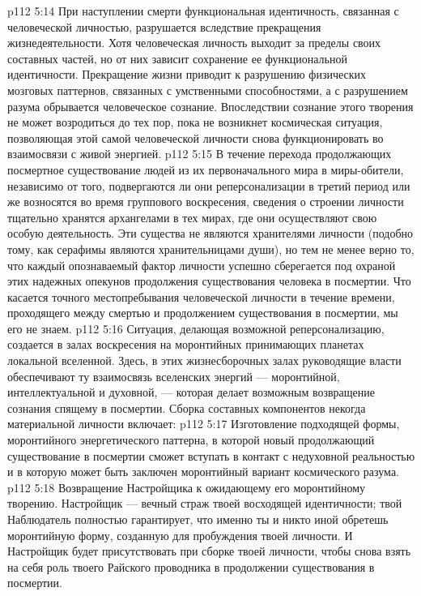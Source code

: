 \vs p112 5:14 При наступлении смерти функциональная идентичность, связанная с человеческой личностью, разрушается вследствие прекращения жизнедеятельности. Хотя человеческая личность выходит за пределы своих составных частей, но от них зависит сохранение ее функциональной идентичности. Прекращение жизни приводит к разрушению физических мозговых паттернов, связанных с умственными способностями, а с разрушением разума обрывается человеческое сознание. Впоследствии сознание этого творения не может возродиться до тех пор, пока не возникнет космическая ситуация, позволяющая этой самой человеческой личности снова функционировать во взаимосвязи с живой энергией.
\vs p112 5:15 \pc В течение перехода продолжающих посмертное существование людей из их первоначального мира в миры\hyp{}обители, независимо от того, подвергаются ли они реперсонализации в третий период или же возносятся во время группового воскресения, сведения о строении личности тщательно хранятся архангелами в тех мирах, где они осуществляют свою особую деятельность. Эти существа не являются хранителями личности (подобно тому, как серафимы являются хранительницами души), но тем не менее верно то, что каждый опознаваемый фактор личности успешно сберегается под охраной этих надежных опекунов продолжения существования человека в посмертии. Что касается точного местопребывания человеческой личности в течение времени, проходящего между смертью и продолжением существования в посмертии, мы его не знаем.
\vs p112 5:16 \pc Ситуация, делающая возможной реперсонализацию, создается в залах воскресения на моронтийных принимающих планетах локальной вселенной. Здесь, в этих жизнесборочных залах руководящие власти обеспечивают ту взаимосвязь вселенских энергий --- моронтийной, интеллектуальной и духовной, --- которая делает возможным возвращение сознания спящему в посмертии. Сборка составных компонентов некогда материальной личности включает:
\vs p112 5:17 \bibnobreakspace Изготовление подходящей формы, моронтийного энергетического паттерна, в которой новый продолжающий существование в посмертии сможет вступать в контакт с недуховной реальностью и в которую может быть заключен моронтийный вариант космического разума.
\vs p112 5:18 \bibnobreakspace Возвращение Настройщика к ожидающему его моронтийному творению. Настройщик --- вечный страж твоей восходящей идентичности; твой Наблюдатель полностью гарантирует, что именно ты и никто иной обретешь моронтийную форму, созданную для пробуждения твоей личности. И Настройщик будет присутствовать при сборке твоей личности, чтобы снова взять на себя роль твоего Райского проводника в продолжении существования в посмертии.
